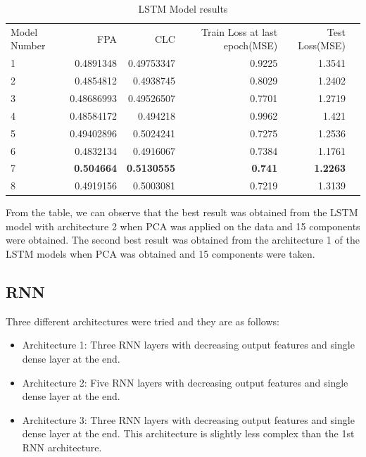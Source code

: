 \begin{table}[!htp]\centering
\caption{LSTM Model results}\label{tab: }
\scriptsize
\begin{tabular}{lrrrrr}\toprule
Model Number &FPA &CLC &Train Loss at last epoch(MSE) &Test Loss(MSE) \\
1 &0.4891348 &0.49753347 &0.9225 &1.3541 \\\midrule
2 &0.4854812 &0.4938745 &0.8029 &1.2402 \\
3 &0.48686993 &0.49526507 &0.7701 &1.2719 \\
4 &0.48584172 &0.494218 &0.9962 &1.421 \\
5 &0.49402896 &0.5024241 &0.7275 &1.2536 \\
6 &0.4832134 &0.4916067 &0.7384 &1.1761 \\
7 &\textbf{0.504664} &\textbf{0.5130555} &\textbf{0.741} &\textbf{1.2263} \\
8 &0.4919156 &0.5003081 &0.7219 &1.3139 \\
\bottomrule
\end{tabular}
\end{table}

From the table, we can observe that the best result was obtained from the LSTM model with architecture 2 when PCA was applied on the data and 15 components were obtained. The second best result was obtained from the architecture 1 of the LSTM models when PCA was obtained and 15 components were taken.

\subsection{RNN}

Three different architectures were tried and they are as follows:
 \begin{itemize}
     \item Architecture 1: Three RNN layers with decreasing output features and single dense layer at the end.
     \item Architecture 2: Five RNN layers with decreasing output features and single dense layer at the end.
     \item Architecture 3: Three RNN layers with decreasing output features and single dense layer at the end. This architecture is slightly less complex than the 1st RNN architecture.
 \end{itemize}
 
